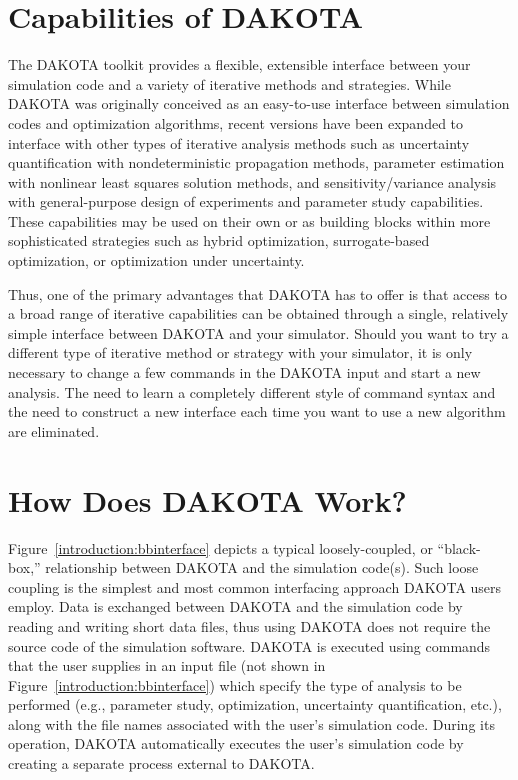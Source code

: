 \section{Capabilities of DAKOTA}\label{introduction:capabilities}

The DAKOTA toolkit provides a flexible, extensible interface between
your simulation code and a variety of iterative methods and
strategies. While DAKOTA was originally conceived as an easy-to-use
interface between simulation codes and optimization algorithms, recent
versions have been expanded to interface with other types of iterative
analysis methods such as uncertainty quantification with
nondeterministic propagation methods, parameter estimation with
nonlinear least squares solution methods, and sensitivity/variance
analysis with general-purpose design of experiments and parameter
study capabilities. These capabilities may be used on their own or as
building blocks within more sophisticated strategies such as hybrid
optimization, surrogate-based optimization, or optimization under
uncertainty.

Thus, one of the primary advantages that DAKOTA has to offer is that
access to a broad range of iterative capabilities can be obtained
through a single, relatively simple interface between DAKOTA and your
simulator. Should you want to try a different type of iterative method
or strategy with your simulator, it is only necessary to change a few
commands in the DAKOTA input and start a new analysis. The need to
learn a completely different style of command syntax and the need to
construct a new interface each time you want to use a new algorithm
are eliminated.

\section{How Does DAKOTA Work?}\label{introduction:how}

Figure~\ref{introduction:bbinterface} depicts a typical
loosely-coupled, or ``black-box,'' relationship between DAKOTA and the
simulation code(s).  Such loose coupling is the simplest and most
common interfacing approach DAKOTA users employ. Data is exchanged
between DAKOTA and the simulation code by reading and writing short
data files, thus using DAKOTA does not require the source code of the
simulation software. DAKOTA is executed using commands that the user
supplies in an input file (not shown in
Figure~\ref{introduction:bbinterface}) which specify the type of
analysis to be performed (e.g., parameter study, optimization,
uncertainty quantification, etc.), along with the file names
associated with the user's simulation code. During its operation,
DAKOTA automatically executes the user's simulation code by creating a
separate process external to DAKOTA.


